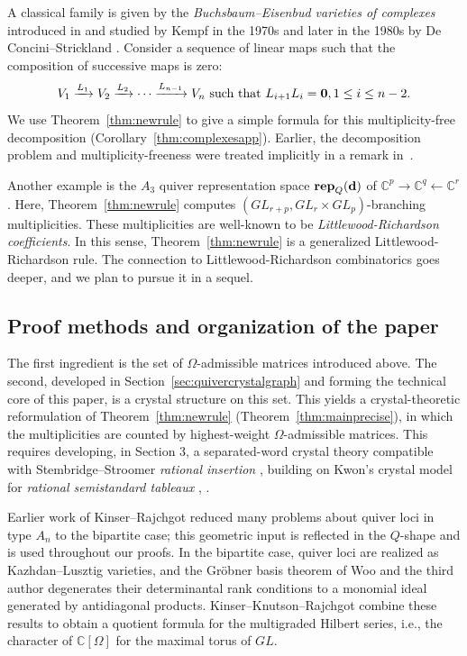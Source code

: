 \documentclass[12pt]{amsart}
\DeclareMathOperator{\rep}{\mathbf{rep}}
\theoremstyle{definition}
\theoremstyle{remark}
\begin{document}
A classical family is given by the
\emph{Buchsbaum--Eisenbud varieties of complexes}  
introduced in \cite{Buchsbaum.Eisenbud}  and studied by Kempf \cite{Kempf}
in the 1970s and later in the 1980s by De Concini–Strickland \cite{Strickland}. Consider a sequence of linear maps such that the composition of successive maps is zero:
\[V_1 \xrightarrow{L_1} V_2 \xrightarrow{L_2} \cdots \xrightarrow{L_{n-1}} V_n \text{\ such that } L_{i+1}L_i={\bf 0}, 1\leq i\leq n-2.\]  
We use Theorem~\ref{thm:newrule} to give a simple formula for this multiplicity-free decomposition (Corollary~\ref{thm:complexesapp}). 
Earlier, the decomposition problem and multiplicity-freeness were treated implicitly in a remark in~\cite[p.~70]{Strickland}.

Another example is the $A_3$ quiver representation space $\rep_{Q}({\bf d})$ of
${\mathbb C}^p\rightarrow {\mathbb C}^q \leftarrow
{\mathbb C}^r$. Here, Theorem~\ref{thm:newrule} computes $(GL_{r+p},GL_r\times GL_p)$-branching 
multiplicities. These multiplicities are well-known
to be \emph{Littlewood-Richardson coefficients}. In this sense, Theorem~\ref{thm:newrule} is a generalized Littlewood-Richardson
rule. The connection to Littlewood-Richardson combinatorics goes deeper, and we plan to pursue it in a sequel.



\subsection{Proof methods and organization of the paper}
The first ingredient is the set of $\Omega$-admissible matrices introduced above.
The second, developed in Section~\ref{sec:quivercrystalgraph} and forming the
technical core of this paper, is a crystal structure on this set.
This yields a crystal-theoretic reformulation of Theorem~\ref{thm:newrule} (Theorem~\ref{thm:mainprecise}), in which the multiplicities are counted by highest-weight $\Omega$-admissible matrices.
This requires developing, in Section 3, a separated-word crystal theory compatible with Stembridge--Stroomer \emph{rational insertion} 
\cite{Stembridge, Stroomer}, building on Kwon's crystal model for \emph{rational semistandard tableaux} \cite[\S~5.3, Lemma~5.8]{Kwon}, \cite[\S~3.4]{Kwon2}. 

Earlier work of Kinser--Rajchgot \cite{KinserRajchgot} reduced many
problems about quiver loci in type $A_n$ to the bipartite case; this
geometric input is reflected in the $Q$-shape and is used throughout
our proofs. In the bipartite case, quiver loci are realized as
Kazhdan--Lusztig varieties, and the Gr\"obner basis theorem of Woo and
the third author \cite{WooYong}  degenerates their
determinantal rank conditions to a monomial ideal generated by
antidiagonal products.
Kinser--Knutson--Rajchgot
\cite{KKR} combine these results to obtain a quotient formula for the
multigraded Hilbert series, i.e., the character of $\mathbb C[\Omega]$
for the maximal torus of $GL$.
\end{document}
